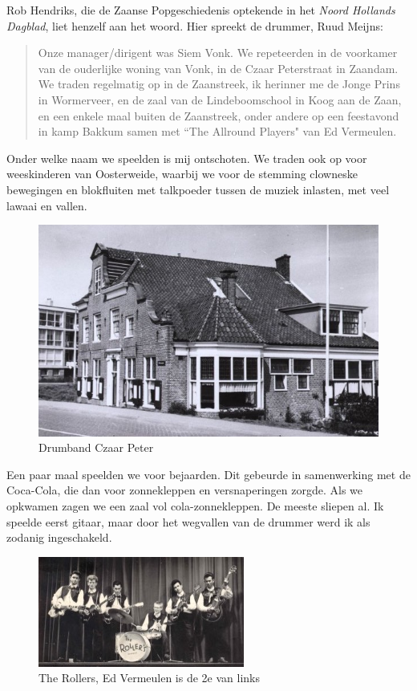 \documentclass[10pt,twoside, openright]{memoir}
\begin{document}
Rob Hendriks, die de Zaanse Popgeschiedenis optekende in het \emph{Noord Hollands Dagblad}, liet henzelf aan het woord. Hier spreekt de drummer, Ruud Meijns: 

\begin{quote}
Onze manager/dirigent was Siem Vonk. We repeteerden in de voorkamer van de ouderlijke woning van Vonk, in de Czaar Peterstraat in Zaandam. We traden regelmatig op in de Zaanstreek, ik herinner me de Jonge Prins in Wormerveer, en de zaal van de Lindeboomschool in Koog aan de Zaan, en een enkele maal buiten de Zaanstreek, onder andere op een feestavond in kamp Bakkum samen met ``The Allround Players" van Ed Vermeulen.
\end{quote}

Onder welke naam we speelden is mij ontschoten. We traden ook op voor weeskinderen van Oosterweide, waarbij we voor de stemming clowneske bewegingen en blokfluiten met talkpoeder tussen de muziek inlasten, met veel lawaai en vallen. 

\begin{figure}
\includegraphics[width=\textwidth]{img/ch24/Oosterweide}
\caption*{\footnotesize Drumband Czaar Peter}
\end{figure}

Een paar maal speelden we voor bejaarden. Dit gebeurde in samenwerking met de Coca-Cola, die dan voor zonnekleppen en versnaperingen zorgde. Als we opkwamen zagen we een zaal vol cola-zonnekleppen. De meeste sliepen al. Ik speelde eerst gitaar, maar door het wegvallen van de drummer werd ik als zodanig ingeschakeld. 

\begin{figure}
\includegraphics[width=\textwidth]{img/ch24/rollers}
\caption*{\footnotesize The Rollers, Ed Vermeulen is de 2e van links}
\end{figure}
\end{document}

